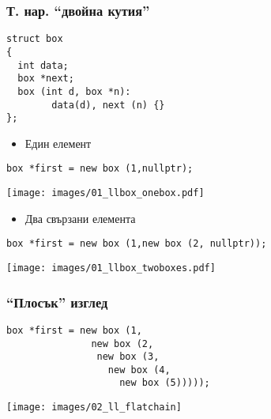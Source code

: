 \documentclass{beamer}
\begin{document}
\begin{frame}[fragile]
\frametitle{Т. нар. ``двойна кутия''}

\begin{flushleft}
\begin{lstlisting}
struct box
{
  int data;
  box *next;
  box (int d, box *n):
        data(d), next (n) {}
};
\end{lstlisting}  
\end{flushleft}

\begin{itemize}
  \item  Един елемент
\end{itemize}

\begin{flushleft}
\begin{lstlisting}
box *first = new box (1,nullptr);
\end{lstlisting}  
\end{flushleft}

\texttt{[image: images/01\_llbox\_onebox.pdf]}

\vspace{-210px}

\begin{itemize}
  \item  Два свързани елемента
\end{itemize}

\begin{flushleft}
\begin{lstlisting}
box *first = new box (1,new box (2, nullptr));
\end{lstlisting}  
\end{flushleft}

\texttt{[image: images/01\_llbox\_twoboxes.pdf]}


\end{frame}


\begin{frame}[fragile]
\frametitle{``Плосък'' изглед}

\begin{flushleft}
\begin{lstlisting}
box *first = new box (1,
               new box (2, 
                new box (3, 
                  new box (4, 
                    new box (5)))));
\end{lstlisting}  
\end{flushleft}


\texttt{[image: images/02\_ll\_flatchain]}

\end{frame}
\end{document}
